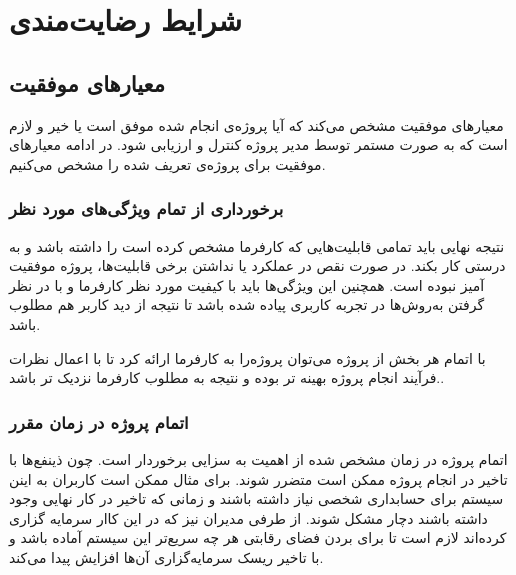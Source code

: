 


\chapter{
	شرایط رضایت‌مندی
}



\section{معیارهای موفقیت}
معیار‌های موفقیت مشخص می‌کند که آیا پروژه‌ی انجام شده موفق است یا خیر و لازم است که به صورت مستمر توسط مدیر پروژه کنترل و ارزیابی شود.
در ادامه معیار‌های موفقیت برای پروژه‌ی تعریف شده را مشخص می‌کنیم.

\subsection{برخورداری از تمام ویژگی‌های مورد نظر}
نتیجه نهایی باید تمامی قابلیت‌هایی که کارفرما مشخص کرده است را داشته باشد و به درستی کار بکند. در صورت نقص در عملکرد یا نداشتن برخی قابلیت‌ها، پروژه موفقیت آمیز نبوده است.
همچنین این ویژگی‌ها باید با کیفیت مورد نظر کارفرما و با در نظر گرفتن به‌روش‌ها در تجربه کاربری پیاده شده باشد تا نتیجه از دید کاربر هم مطلوب باشد.

با اتمام هر بخش از پروژه می‌توان پروژه‌را به کارفرما ارائه کرد تا با اعمال نظرات  فرآیند انجام پروژه بهینه تر بوده و نتیجه به مطلوب کارفرما نزدیک تر باشد..

\subsection{اتمام پروژه در زمان مقرر}
اتمام پروژه در زمان مشخص شده از اهمیت به سزایی برخوردار است. چون ذینفع‌ها با تاخیر در انجام پروژه ممکن است متضرر شوند.
برای مثال ممکن است کاربران به اینن سیستم برای حسابداری شخصی نیاز داشته باشند و زمانی که تاخیر در کار نهایی وجود داشته باشند دچار مشکل شوند.
از طرفی مدیران نیز که در این کاار سرمایه گزاری کرده‌اند لازم است تا برای بردن فضای رقابتی هر چه سریع‌تر این سیستم آماده باشد و با تاخیر ریسک سرمایه‌گزاری آن‌ها افزایش پیدا می‌کند.

